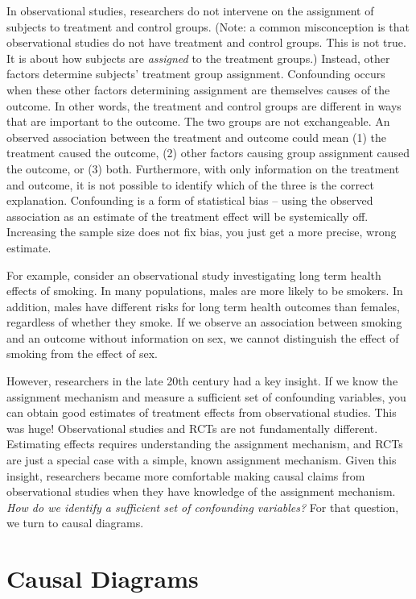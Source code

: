 \documentclass[]{book}
\begin{document}
In observational studies, researchers do not intervene on the assignment of subjects to treatment and control groups. (Note: a common misconception is that observational studies do not have treatment and control groups. This is not true. It is about how subjects are \emph{assigned} to the treatment groups.) Instead, other factors determine subjects' treatment group assignment. Confounding occurs when these other factors determining assignment are themselves causes of the outcome. In other words, the treatment and control groups are different in ways that are important to the outcome. The two groups are not exchangeable. An observed association between the treatment and outcome could mean (1) the treatment caused the outcome, (2) other factors causing group assignment caused the outcome, or (3) both. Furthermore, with only information on the treatment and outcome, it is not possible to identify which of the three is the correct explanation. Confounding is a form of statistical bias -- using the observed association as an estimate of the treatment effect will be systemically off. Increasing the sample size does not fix bias, you just get a more precise, wrong estimate.

For example, consider an observational study investigating long term health effects of smoking. In many populations, males are more likely to be smokers. In addition, males have different risks for long term health outcomes than females, regardless of whether they smoke. If we observe an association between smoking and an outcome without information on sex, we cannot distinguish the effect of smoking from the effect of sex.

However, researchers in the late 20th century had a key insight. If we know the assignment mechanism and measure a sufficient set of confounding variables, you can obtain good estimates of treatment effects from observational studies. This was huge! Observational studies and RCTs are not fundamentally different. Estimating effects requires understanding the assignment mechanism, and RCTs are just a special case with a simple, known assignment mechanism. Given this insight, researchers became more comfortable making causal claims from observational studies when they have knowledge of the assignment mechanism. \emph{How do we identify a sufficient set of confounding variables?} For that question, we turn to causal diagrams.

\hypertarget{causal-diagrams}{%
\section{Causal Diagrams}\label{causal-diagrams}}
\end{document}
